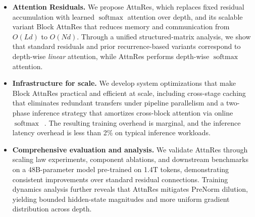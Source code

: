 \begin{itemize}[leftmargin=*]
    \item \textbf{Attention Residuals.} We propose AttnRes, which replaces fixed residual accumulation with learned $\operatorname{softmax}$ attention over depth, and its scalable variant Block AttnRes that reduces memory and communication from $O(Ld)$ to $O(Nd)$. Through a unified structured-matrix analysis, we show that standard residuals and prior recurrence-based variants correspond to depth-wise \emph{linear} attention, while AttnRes performs depth-wise $\operatorname{softmax}$ attention.
    \item \textbf{Infrastructure for scale.} We develop system optimizations that make Block AttnRes practical and efficient at scale, including cross-stage caching that eliminates redundant transfers under pipeline parallelism and a two-phase inference strategy that amortizes cross-block attention via online $\operatorname{softmax}$~\citep{milakov2018online}. The resulting training overhead is marginal, and the inference latency overhead is less than 2\% on typical inference workloads.
    \item \textbf{Comprehensive evaluation and analysis.} We validate AttnRes through scaling law experiments, component ablations, and downstream benchmarks on a 48B-parameter model pre-trained on 1.4T tokens, demonstrating consistent improvements over standard residual connections. Training dynamics analysis further reveals that AttnRes mitigates PreNorm dilution, yielding bounded hidden-state magnitudes and more uniform gradient distribution across depth.
\end{itemize}

\newpage